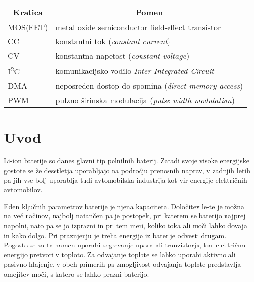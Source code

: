 \documentclass[a4paper,twoside,openright,12pt,slovene]{book}
\begin{document}
\begin{table}[H]
    \centering
    \label{tab:seznam-kratic}
    \begin{tabular}{ll}
        \multicolumn{1}{c}{Kratica} & \multicolumn{1}{c}{Pomen}                                    \\ \hline
        MOS(FET)                    & metal oxide semiconductor field-effect transistor            \\ \hline
        CC                          & konstantni tok (\textit{constant current})                   \\ \hline
        CV                          & konstantna napetost (\textit{constant voltage})              \\ \hline
        I\textsuperscript{2}C       & komunikacijsko vodilo \textit{Inter-Integrated Circuit}      \\ \hline
        DMA                         & neposreden dostop do spomina (\textit{direct memory access}) \\ \hline
        PWM                         & pulzno širinska modulacija (\textit{pulse width modulation}) \\ \hline
    \end{tabular}
\end{table}

\mainmatter

\chapter{Uvod} \label{ch:uvod}

Li-ion baterije so danes glavni tip polnilnih baterij.
Zaradi svoje visoke energijske gostote se že desetletja uporabljajo na področju prenosnih naprav,
v zadnjih letih pa jih vse bolj uporablja tudi avtomobilska industrija kot vir energije električnih avtomobilov.

Eden ključnih parametrov baterije je njena kapaciteta.
Določitev le-te je možna na več načinov, najbolj natančen pa je postopek, pri katerem se baterijo najprej napolni,
nato pa se jo izprazni in pri tem meri, koliko toka ali moči lahko dovaja in kako dolgo.
Pri praznjenju je treba energijo iz baterije odvesti drugam.
Pogosto se za ta namen uporabi segrevanje upora ali tranzistorja, kar električno energijo pretvori v toploto.
Za odvajanje toplote se lahko uporabi aktivno ali pasivno hlajenje, v obeh primerih pa zmogljivost odvajanja toplote predstavlja omejitev moči, s katero se lahko prazni baterijo.
\end{document}
